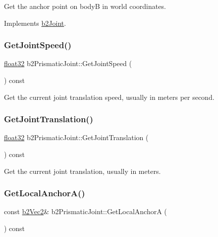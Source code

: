 Get the anchor point on bodyB in world coordinates. 



Implements \mbox{\hyperlink{classb2_joint_a88e947c65d4ea26fe539f02a8cb7f7a9}{b2\+Joint}}.

\mbox{\label{classb2_prismatic_joint_af407d14ac024abdee49b852613f1bbc2}} 
\subsubsection{\texorpdfstring{GetJointSpeed()}{GetJointSpeed()}}
{\footnotesize\ttfamily \mbox{\hyperlink{b2_settings_8h_aacdc525d6f7bddb3ae95d5c311bd06a1}{float32}} b2\+Prismatic\+Joint\+::\+Get\+Joint\+Speed (\begin{DoxyParamCaption}{ }\end{DoxyParamCaption}) const}



Get the current joint translation speed, usually in meters per second. 

\mbox{\label{classb2_prismatic_joint_abb008b99fb2df7357e6f3166d3c8b192}} 
\subsubsection{\texorpdfstring{GetJointTranslation()}{GetJointTranslation()}}
{\footnotesize\ttfamily \mbox{\hyperlink{b2_settings_8h_aacdc525d6f7bddb3ae95d5c311bd06a1}{float32}} b2\+Prismatic\+Joint\+::\+Get\+Joint\+Translation (\begin{DoxyParamCaption}{ }\end{DoxyParamCaption}) const}



Get the current joint translation, usually in meters. 

\mbox{\label{classb2_prismatic_joint_a0a4812486867f4c7507bb8c29e860997}} 
\subsubsection{\texorpdfstring{GetLocalAnchorA()}{GetLocalAnchorA()}}
{\footnotesize\ttfamily const \mbox{\hyperlink{structb2_vec2}{b2\+Vec2}}\& b2\+Prismatic\+Joint\+::\+Get\+Local\+AnchorA (\begin{DoxyParamCaption}{ }\end{DoxyParamCaption}) const\hspace{0.3cm}{\ttfamily [inline]}}



